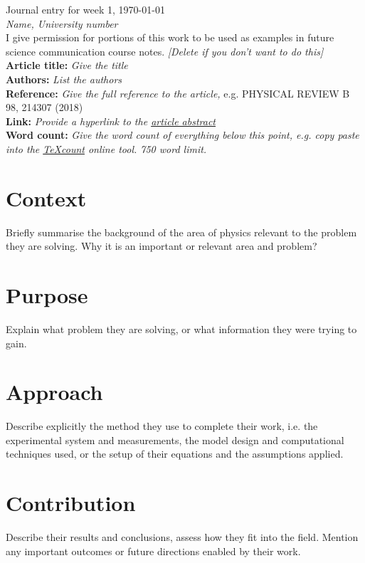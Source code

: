 \documentclass[12pt,a4paper]{article}
\begin{document}
Journal entry for week 1, \today \\
\textit{Name, University number}\\
I give permission for portions of this work to be used as examples in future science communication course notes. \textit{[Delete if you don't want to do this]}\\


\textbf{Article title:} \textit{Give the title} \\
\textbf{Authors:} \textit{List the authors} \\
\textbf{Reference:} \textit{Give the full reference to the article,} e.g. PHYSICAL REVIEW B 98, 214307 (2018) \\
\textbf{Link:}  \textit{Provide a hyperlink to the \href{https://journals.aps.org/prb/abstract/10.1103/PhysRevB.98.214307}{article abstract}} \\
\textbf{Word count:} \textit{Give the word count of everything below this point, e.g. copy paste into the \href{https://app.uio.no/ifi/texcount/online.php}{TeXcount} online tool. 750 word limit.} \\

\section*{Context}
Briefly summarise the background of the area of physics relevant to the problem they are solving. Why it is an important or relevant area and problem?

\section*{Purpose}
Explain what problem they are solving, or what information they were trying to gain.

\section*{Approach}
Describe explicitly the method they use to complete their work, i.e. the experimental system and measurements, the model design and computational techniques used, or the setup of their equations and the assumptions applied.

\section*{Contribution}
Describe their results and conclusions, assess how they fit into the field. Mention any important outcomes or future directions enabled by their work.
\end{document}
